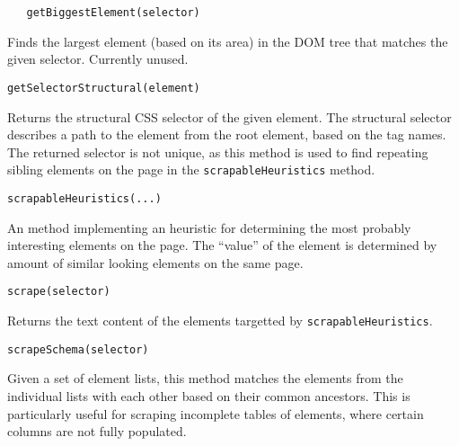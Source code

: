\verb|   getBiggestElement(selector)|
\smallskip

Finds the largest element (based on its area) in the DOM tree that matches the given selector.
Currently unused.

\emptyline
\verb|getSelectorStructural(element)|
\smallskip

Returns the structural \acs{CSS} selector of the given element. 
The structural selector describes a path to the element from the root element, based on the tag names.
The returned selector is not unique, as this method is used to find repeating sibling elements on the page in the \texttt{scrapableHeuristics} method.

\emptyline
\verb|scrapableHeuristics(...)|
\smallskip

An method implementing an heuristic for determining the most probably interesting elements on the page.
The ``value'' of the element is determined by amount of similar looking elements on the same page.

\emptyline
\verb|scrape(selector)|
\smallskip

Returns the text content of the elements targetted by \texttt{scrapableHeuristics}.

\emptyline
\verb|scrapeSchema(selector)|
\smallskip

Given a set of element lists, this method matches the elements from the individual lists with each other based on their common ancestors.
This is particularly useful for scraping incomplete tables of elements, where certain columns are not fully populated.